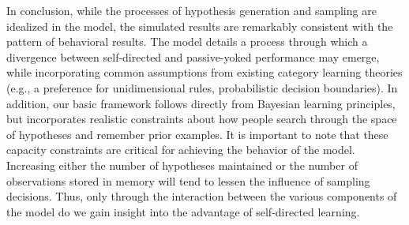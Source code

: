 \documentclass[3p,twocolumn,authoryear,10pt]{elsarticle}
\begin{document}
In conclusion, while the processes of hypothesis generation and sampling are idealized in the model, the simulated results are remarkably consistent with the pattern of behavioral results. The model details a process through which a divergence between self-directed and passive-yoked performance may emerge, while incorporating common assumptions from existing category learning theories (e.g., a preference for unidimensional rules, probabilistic decision boundaries). In addition, our basic framework follows directly from Bayesian learning principles, but incorporates realistic constraints about how people search through the space of hypotheses and remember prior examples. It is important to note that these capacity constraints are critical for achieving the behavior of the model. Increasing either the number of hypotheses maintained or the number of observations stored in memory will tend to lessen the influence of sampling decisions.  Thus, only through the interaction between the
various components of the model do we gain insight into the advantage of self-directed learning.



\end{document}
